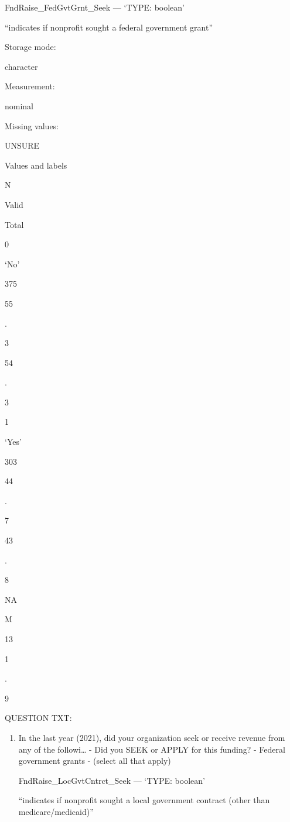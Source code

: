 \documentclass[
  letterpaper,
]{scrbook}
\providecommand{\tightlist}{%
  \setlength{\itemsep}{0pt}\setlength{\parskip}{0pt}}\usepackage{longtable,booktabs,array}
\begin{document}
\begin{enumerate}
\begin{enumerate}
    FndRaise\_FedGvtGrnt\_Seek --- {`TYPE: boolean'}

    ``indicates if nonprofit sought a federal government grant''

    Storage mode:

    character

    Measurement:

    nominal

    Missing values:

    UNSURE

    Values and labels

    N

    Valid

    Total

    0

    `No'

    375

    55

    .

    3

    54

    .

    3

    1

    `Yes'

    303

    44

    .

    7

    43

    .

    8

    NA

    M

    13

    1

    .

    9

    QUESTION TXT:

    \begin{enumerate}
    \def\labelenumiii{\arabic{enumiii}.}
    \setcounter{enumiii}{8}
    \tightlist
    \item
      In the last year (2021), did your organization seek or receive
      revenue from any of the followi\ldots{} - Did you SEEK or APPLY
      for this funding? - Federal government grants - (select all that
      apply)

      FndRaise\_LocGvtCntrct\_Seek --- {`TYPE: boolean'}

      ``indicates if nonprofit sought a local government contract (other
      than medicare/medicaid)''


\end{enumerate}
\end{enumerate}
\end{enumerate}
\end{document}
